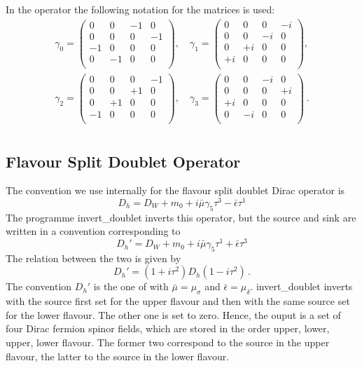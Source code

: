 In the operator the following notation for
the matrices is used:
\[
\begin{split}
  \gamma_0 = \begin{pmatrix}
    0 & 0 & -1 & 0 \\
    0 & 0 & 0 & -1 \\
    -1 & 0 & 0 & 0 \\
    0 & -1 & 0 & 0 \\
  \end{pmatrix},\quad
  \gamma_1 = \begin{pmatrix}
    0 & 0 & 0 & -i \\
    0 & 0 & -i & 0 \\
    0 & +i & 0 & 0 \\
    +i & 0 & 0 & 0 \\    
  \end{pmatrix},\\
  \gamma_2 = \begin{pmatrix}
    0 & 0 & 0 & -1 \\
    0 & 0 & +1 & 0 \\
    0 & +1 & 0 & 0 \\
    -1 & 0 & 0 & 0 \\   
  \end{pmatrix},\quad
  \gamma_3 = \begin{pmatrix}
    0 & 0 & -i & 0 \\
    0 & 0 & 0 & +i \\
    +i & 0 & 0 & 0 \\
    0 & -i & 0 & 0 \\
  \end{pmatrix}\ .\\
\end{split}
\]

\subsection{Flavour Split Doublet Operator}

The convention we use internally for the flavour split doublet Dirac
operator is 
\[
D_h = D_W + m_0 + i\bar\mu\gamma_5\tau^3 - \bar\epsilon\tau^1
\]
The programme {\ttfamily invert\_doublet} inverts this operator, but
the source and sink are written in a convention corresponding to
\[
D_h' = D_W + m_0 + i\bar\mu\gamma_5\tau^1 + \bar\epsilon\tau^3
\]
The relation between the two is given by
\[
D_h' = (1+i\tau^2)D_h(1-i\tau^2)\, .
\]
The convention $D_h'$ is the one of \cite{Chiarappa:2006ae} with
$\bar\mu = \mu_\sigma$ and $\bar\epsilon = \mu_\delta$. {\ttfamily
  invert\_doublet} inverts with the source first set for the upper
flavour and then with the same source set for the lower
flavour. The other one is set to zero. Hence, the ouput is a set of
four Dirac fermion spinor fields, which are stored in the order upper,
lower, upper, lower flavour. The former two correspond to the source
in the upper flavour, the latter to the source in the lower flavour.



